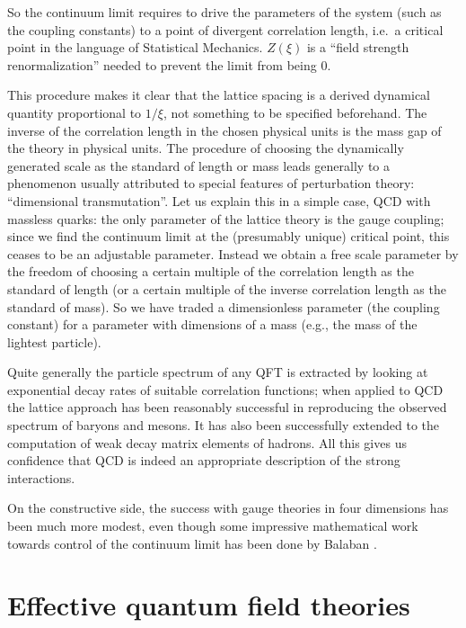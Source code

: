 \documentclass[multphys,vecphys]{svmult}
\begin{document}
So the continuum limit requires to drive the parameters of the system
(such as the coupling constants) to a point of divergent correlation
length, i.e.\ a critical point in the language of Statistical
Mechanics. $Z(\xi)$ is a ``field strength
renormalization'' needed to prevent the limit
from being 0.  

This procedure makes it clear that the lattice spacing is a derived dynamical quantity proportional
to $1/\xi$, not something to be specified beforehand. The inverse of
the correlation length in the chosen physical units is the mass gap of
the theory in physical units. The procedure of choosing the
dynamically generated scale as the standard of length or mass leads
generally to a phenomenon usually attributed to special features of
perturbation theory: ``dimensional transmutation''. Let us explain
this in a simple case, QCD with massless quarks: the only
parameter of the lattice theory is the gauge coupling; since we find
the continuum limit at the (presumably unique) critical point, this
ceases to be an adjustable parameter. Instead we obtain a free scale
parameter by the freedom of choosing a certain multiple of the  
correlation length as the standard of length (or a certain multiple of 
the inverse correlation length as the standard of mass). So we have 
traded a dimensionless parameter (the coupling constant) for a parameter 
with dimensions of a mass (e.g., the mass of the lightest particle).

Quite generally the particle spectrum of any QFT is
extracted by looking at exponential decay rates of suitable
correlation functions; when applied to QCD the
lattice approach has been reasonably
successful in reproducing the observed spectrum of baryons and mesons. 
It has also been successfully extended to the computation of
weak decay matrix elements of hadrons. All
this gives us confidence that QCD is indeed an appropriate description
of the strong interactions. 

On the constructive side, the success with
gauge theories in four dimensions has been much more modest, even
though some impressive mathematical work towards control of the
continuum limit has been done by Balaban \cite{Bal}. 

\section{Effective quantum field theories}\label{effect}
\end{document}
